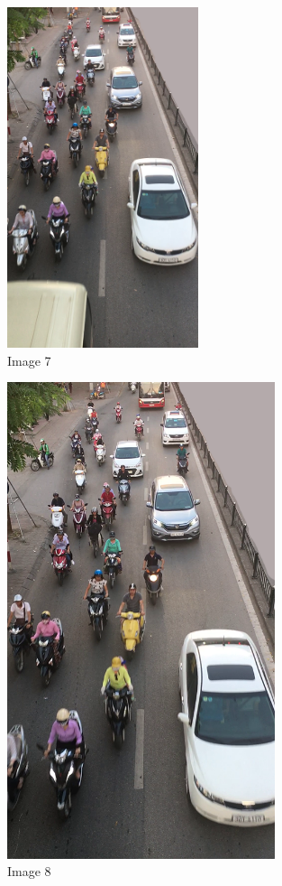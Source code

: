   \begin{center}
    \begin{figure}[H]
        \centering
      \includegraphics[width=0.5\textwidth]{Chapters/Fig/07}
      \caption{Image 7}
      \label{fig:img07}
  \end{figure}
\end{center}

\begin{center}
    \begin{figure}[H]
        \centering
      \includegraphics[width=0.7\textwidth]{Chapters/Fig/08}
      \caption{Image 8}
      \label{fig:img08}
  \end{figure}
\end{center}

